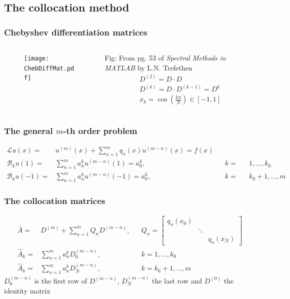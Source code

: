 \documentclass{beamer}
\begin{document}
\subsection{The collocation method}

\begin{frame}
\frametitle{Chebyshev differentiation matrices}

\begin{columns}

\begin{column}{0.5\textwidth}
\begin{figure}
\texttt{[image: ChebDiffMat.pdf]}
\end{figure}
\end{column}
\begin{column}{0.5\textwidth}
Fig: From pg. 53 of \textit{Spectral Methods in MATLAB} by L.N. Trefethen
\begin{equation*} \label{diff matrix}
\begin{gathered}
D^{(2)} = D \cdot D \\ D^{(k)} = D \cdot D^{(k-1)} = D^k \\
x_k = \cos \left ( \frac{k \pi}{N} \right ) \in [-1,1]
\end{gathered}
\end{equation*}
\end{column}

\end{columns}
\end{frame}

\begin{frame}
\frametitle{The general $m$-th order problem}
\begin{alignat*}{3}
\mathcal{L} u(x) = &  u^{(m)}(x) + \sum_{n = 1}^m q_n(x) u^{(m-n)}(x) = f(x) \\
\mathcal{B}_k u(1) = & \sum_{n = 1}^m a_n^k u^{(m-n)}(1) = a_0^k, && k = && 1,...,k_0 \\
\mathcal{B}_k u(-1) = & \sum_{n = 1}^m a_n^k u^{(m-n)}(-1) = a_0^k, && k = && k_0+1,...,m 
\end{alignat*}
\end{frame}

\begin{frame}
\frametitle{The collocation matrices}
\begin{align*}
\bar{A} = & D^{(m)} + \sum_{n=1}^m Q_n D^{(m-n)}, && Q_n = \begin{bmatrix} q_n(x_0) & & \\ & \ddots & \\ & & q_n(x_N) \end{bmatrix} \\
\hat{A}_k = & \sum_{n=1}^m a_n^k D^{(m-n)}_0, && k = 1,...,k_0 \\
\hat{A}_k = & \sum_{n=1}^m a_n^k D^{(m-n)}_N, && k = k_0+1,...,m
\end{align*}
$D_0^{(m-n)}$ is the first row of $D^{(m-n)}$, $D_N^{(m-n)}$ the last row and $D^{(0)}$ the identity matrix
\end{frame}
\end{document}
